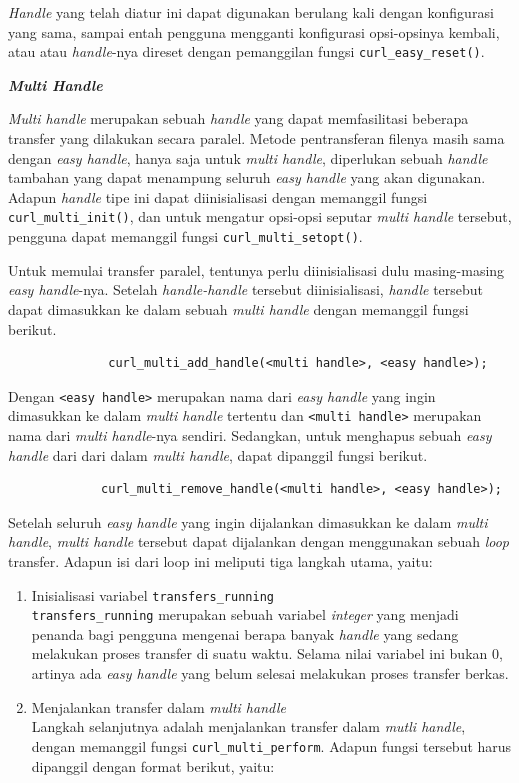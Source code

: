 \documentclass[a4paper,twoside]{article}
\begin{document}
\begin{enumerate}
\textit{Handle} yang telah diatur ini dapat digunakan berulang kali dengan konfigurasi yang sama, sampai entah pengguna mengganti konfigurasi opsi-opsinya kembali, atau atau \textit{handle}-nya direset dengan pemanggilan fungsi \verb|curl_easy_reset()|.

\textbf{\textit{Multi Handle}}
\label{sec:cmodules-libcurl-handlemulti}

\textit{Multi handle} merupakan sebuah \textit{handle} yang dapat memfasilitasi beberapa transfer yang dilakukan secara paralel. Metode pentransferan filenya masih sama dengan \textit{easy handle}, hanya saja untuk \textit{multi handle}, diperlukan sebuah \textit{handle} tambahan yang dapat menampung seluruh \textit{easy handle} yang akan digunakan. Adapun \textit{handle} tipe ini dapat diinisialisasi dengan memanggil fungsi \verb|curl_multi_init()|, dan untuk mengatur opsi-opsi seputar \textit{multi handle} tersebut, pengguna dapat memanggil fungsi \verb|curl_multi_setopt()|.

Untuk memulai transfer paralel, tentunya perlu diinisialisasi dulu masing-masing \textit{easy handle}-nya. Setelah \textit{handle-handle} tersebut diinisialisasi, \textit{handle} tersebut dapat dimasukkan ke dalam sebuah \textit{multi handle} dengan memanggil fungsi berikut.

\begin{verbatim}
              curl_multi_add_handle(<multi handle>, <easy handle>);
\end{verbatim}
\noindent
Dengan \verb|<easy handle>| merupakan nama dari \textit{easy handle} yang ingin dimasukkan ke dalam \textit{multi handle} tertentu dan \verb|<multi handle>| merupakan nama dari \textit{multi handle}-nya sendiri. Sedangkan, untuk menghapus sebuah \textit{easy handle} dari dari dalam \textit{multi handle}, dapat dipanggil fungsi berikut.

\begin{verbatim}
             curl_multi_remove_handle(<multi handle>, <easy handle>);
\end{verbatim}

Setelah seluruh \textit{easy handle} yang ingin dijalankan dimasukkan ke dalam \textit{multi handle}, \textit{multi handle} tersebut dapat dijalankan dengan menggunakan sebuah \textit{loop} transfer. Adapun isi dari loop ini meliputi tiga langkah utama, yaitu:

\begin{enumerate}
	\item Inisialisasi variabel \verb|transfers_running|\\
	\verb|transfers_running| merupakan sebuah variabel \textit{integer} yang menjadi penanda bagi pengguna mengenai berapa banyak \textit{handle} yang sedang melakukan proses transfer di suatu waktu. Selama nilai variabel ini bukan 0, artinya ada \textit{easy handle} yang belum selesai melakukan proses transfer berkas.
	\item Menjalankan transfer dalam \textit{multi handle}\\
	Langkah selanjutnya adalah menjalankan transfer dalam \textit{mutli handle}, dengan memanggil fungsi \verb|curl_multi_perform|. Adapun fungsi tersebut harus dipanggil dengan format berikut, yaitu:


\end{enumerate}
\end{enumerate}
\end{document}
